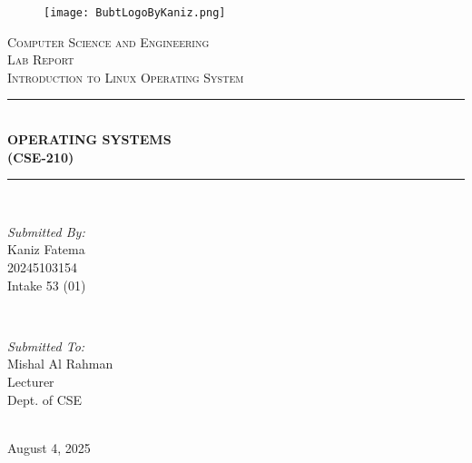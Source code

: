 \documentclass[12pt]{article}
\newcommand{\HRule}{\rule{\linewidth}{0.5 mm}}
\begin{document}
\begin{center}

\begin{figure}[h!]
    \hspace*{0 cm} %
    \texttt{[image: BubtLogoByKaniz.png]}
\end{figure}
\textsc{\Large Computer Science and Engineering }\\[1.5cm]
\textsc{\Large Lab Report}\\[0.3cm]
\textsc{\large Introduction to Linux Operating System}\\[1cm] 
\HRule \\[0.4cm]
{ \huge \bfseries OPERATING SYSTEMS\\[0.2cm]  (CSE-210)}\\[0.2cm] %
\HRule \\[2cm]

\begin{minipage}{0.4\textwidth}
\begin{flushleft} \large
\emph{Submitted By:}\\
Kaniz Fatema \\20245103154\\Intake 53 (01) %
\end{flushleft}
\end{minipage}
~
\begin{minipage}{0.4\textwidth}
\begin{flushright} \large
\emph{Submitted To:} \\
Mishal Al Rahman\\Lecturer\\Dept. of CSE %
\end{flushright}
\end{minipage}\\[5cm]


{\large August 4, 2025}\\[1cm] %
\end{center}
\end{document}
